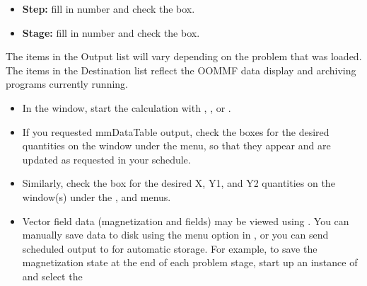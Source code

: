 \begin{list}{}{\setlength{\labelwidth}{0pt}
               \setlength{\leftmargin}{0pt}
               \setlength{\rightmargin}{\leftmargin}
               \setlength{\itemsep}{0pt}}
\begin{description}
\begin{itemize}
\begin{enumerate}
\begin{itemize}
            \item {\bf Step:} fill in number and check the box.
            \item {\bf Stage:} fill in number and check the box.
         \end{itemize}
      \end{enumerate}
      The items in the Output list will vary depending on the
      problem that was loaded.  The items in the Destination list
      reflect the OOMMF data display and archiving programs currently
      running.
    \end{itemize}
    \item[Start calculation:]\blankspace
    \begin{itemize}
       \item In the  window, start the calculation with
         , , or
         .
       \item If you requested mmDataTable output, check the boxes for the
         desired quantities on the
         window under
         the  menu, so that they appear and are updated as
         requested in your schedule.
       \item Similarly, check the box for the desired X, Y1, and Y2
         quantities on the
         window(s) under the ,  and  menus.
    \end{itemize}
    \item[Save and/or display results:]\blankspace
    \begin{itemize}
      \item Vector field data (magnetization and fields) may be
        viewed using
        .
        You can 
        manually save data to disk using
        the  menu option in ,
        or you can send scheduled output to
         for
        automatic storage.  For example, to save the magnetization state
        at the end of each problem  stage, start up an instance of
         and select the

\end{itemize}
\end{description}
\end{list}
